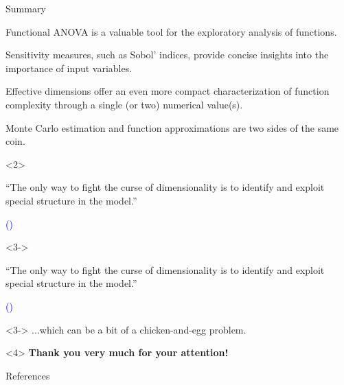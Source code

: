 \documentclass[english,aspectratio=169]{beamer}
\let\tempone\itemize
\let\temptwo\enditemize
\renewenvironment{itemize}{\tempone\addtolength{\itemsep}{0.35\baselineskip}}{\temptwo}
\renewcommand{\emph}[1]{\textcolor[HTML]{006d2c}{\fontseries{sb}\selectfont #1}}
\begin{document}
\begin{frame}[fragile]{Summary}
\small

\begin{itemize}
  \item Functional ANOVA is a valuable tool for the \emph{exploratory analysis} of functions.
  \item Sensitivity measures, such as Sobol' indices,
        provide concise insights into the \emph{importance of input variables}.
  \item Effective dimensions offer an even \emph{more compact characterization} of function
        complexity through a single (or two) numerical value(s).
  \item Monte Carlo estimation and function approximations are two sides of the same coin.
\end{itemize}

\begin{onlyenv}<2>
  \begin{exampleblock}{}
    {``The only way to fight the curse of dimensionality
    is to identify and exploit special structure in the model.''}
  
    {\hfill \raggedright \tiny \textcolor{blue}{(\cite{Constantine2015})}}
  \end{exampleblock}    
\end{onlyenv}

\begin{onlyenv}<3->
  \begin{exampleblock}{}
    {``The only way to fight the curse of dimensionality
    is to \emph{identify} and \emph{exploit} special structure in the model.''}
  
    {\hfill \raggedright \tiny \textcolor{blue}{(\cite{Constantine2015})}}
  \end{exampleblock}    
\end{onlyenv}

\begin{onlyenv}<3->
  {...which can be a bit of a chicken-and-egg problem.}  
\end{onlyenv}

\begin{exampleblock}<4>{}
  \centering
  \textbf{Thank you very much for your attention!}
\end{exampleblock}

\end{frame}

\appendix

\begin{frame}[allowframebreaks]{References}
  \printbibliography[heading=none]
\end{frame}

\presentationendframe
\end{document}
